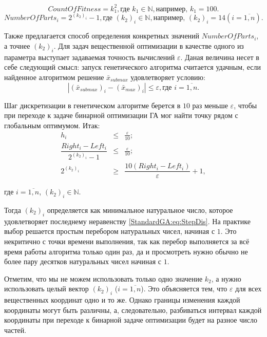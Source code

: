 \begin{equation}
\label{StandardGA:eq:CountOfFitness2}
CountOfFitness=k_1^2,\text{где } k_1 \in \mathbb{N}, \text{например, } k_1=100.
\end{equation}
\begin{equation}
\label{StandardGA:eq:CountOfFitness}
NumberOfParts_i=2^{\left( k_2\right)_i }-1,\text{где } \left( k_2\right)_i \in \mathbb{N}, \text{например, } \left( k_2\right)_i=14 \left( i=\overline{1,n}\right) .
\end{equation}

Также предлагается способ определения конкретных значений $NumberOfParts_i $, а точнее $ \left( k_2\right)_i $. Для задач вещественной оптимизации в качестве одного из параметра выступает задаваемая точность вычислений $ \varepsilon $. Даная величина несет в себе следующий смысл: запуск генетического алгоритма считается удачным, если найденное алгоритмом решение $ \bar{x}_{submax}$ удовлетворяет условию:
\begin{equation}
\label{StandardGA:eq:varepsilon}
\left| \left( \bar{x}_{submax}\right)_i-\left( \bar{x}_{max}\right)_i\right| \leq\varepsilon, \text{где } i=\overline{1,n}.
\end{equation}

Шаг дискретизации в генетическом алгоритме берется в $ 10 $ раз меньше $ \varepsilon $, чтобы при переходе к задаче бинарной оптимизации ГА мог найти точку рядом с глобальным оптимумом. Итак:
\begin{eqnarray}
\label{StandardGA:eq:StepDis}
h_i&\leq&\frac{\varepsilon}{10};\nonumber\\
\dfrac{Right_i-Left_i}{2^{\left( k_2\right)_i }-1}&\leq&\frac{\varepsilon}{10};\nonumber\\
2^{\left( k_2\right)_i }&\geq&\dfrac{10\left(Right_i-Left_i \right) }{\varepsilon}+1,
\end{eqnarray}

где $ i=\overline{1,n} $, $ \left( k_2\right)_i \in \mathbb{N} $.

Тогда  $ \left( k_2\right)_i $ определяется как минимальное натуральное число, которое удовлетворяет последнему неравенству \ref{StandardGA:eq:StepDis}. На практике выбор решается простым перебором натуральных чисел, начиная с $ 1 $. Это некритично с точки времени выполнения, так как перебор выполняется за всё время работы алгоритма только один раз, да и просмотреть нужно обычно не более пару десятков натуральных чисел начиная с $ 1 $.

Отметим, что мы не можем использовать только одно значение  $ k_2 $, а нужно использовать целый вектор $ \left( k_2\right)_i $ ($ i=\overline{1,n} $). Это объясняется тем, что $ \varepsilon $ для всех вещественных координат одно и то же. Однако границы изменения каждой координаты могут быть различны, а, следовательно, разбиваться интервал каждой координаты при переходе к бинарной задаче оптимизации будет на разное число частей.

